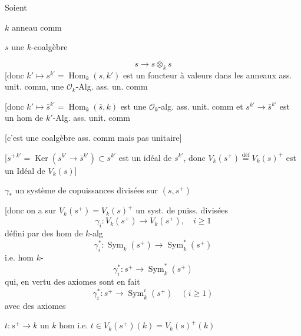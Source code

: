 \begin{flushright}\end{flushright}
Soient

$k$ anneau comm

 \textcircled{$s$} une $k$-coalgèbre 

\[
 \boxed{s\longrightarrow s\otimes_k s}
\]
[donc  $k'\longmapsto s^{k'}=\operatorname{Hom}_k(s,k')$ est un foncteur à valeurs dans les anneaux ass. unit. comm,  une $\mathcal O_k$-Alg. ass. un. comm

[donc  $k'\longmapsto\bar s^{k'}=\operatorname{Hom}_k(\bar s,k)$ est une $\mathcal O_k$-alg. ass. unit. comm et $s^{k'}\longrightarrow\bar s^{k'}$ est un hom de $k'$-Alg. ass. unit. comm 

[c'est une coalgèbre ass. comm mais pas unitaire]

[$s^{+\,k'}=\operatorname{Ker}(s^{k'}\to\bar s^{k'})\subset s^{k'}$ est un idéal de $s^{k'}$, donc $V_k(s^+)\overset{\text{déf}}=V_k(s)^+$ est un Idéal de $V_k(s)$]

\textcircled{$\gamma_*$} un système de copuissances divisées sur $(s,s^+)$

[donc on a sur $V_k(s^+)=V_k(s)^+$ un syst. de puiss. divisées
\[
 \gamma_i:V_k(s^+)\longrightarrow V_k(s^+),\quad i\geq1
\]
défini par des hom de $k$-alg
\[
 \gamma_i^*:\operatorname{Sym}_k(s^+)\longrightarrow\operatorname{Sym}_k^*(s^+)
\]
 i.e. hom $k$-
\[
 \gamma_i^*:s^+\longrightarrow\operatorname{Sym}_k^*(s^+)
\]
qui, en vertu des axiomes sont en fait
\[
 \boxed{\gamma_i^*:s^+\longrightarrow\operatorname{Sym}_k^i(s^+)\quad(i\geq1)}
\]
avec des axiomes 

$t:s^+\to k$ un $k$ hom \qquad i.e. $t\in V_k(s^+)(k)=V_k(s)^+(k)$

